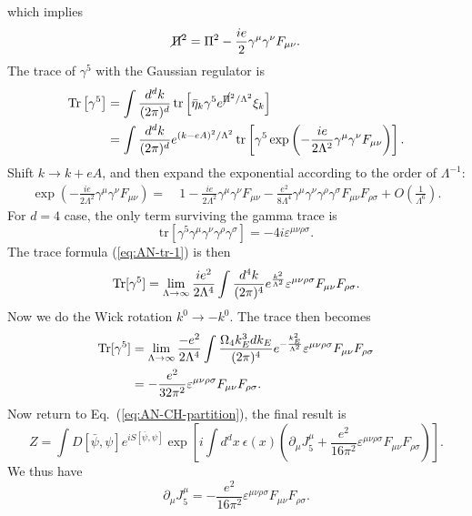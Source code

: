 which implies
\begin{equation}
	\cancel{\Pi}^2 = \Pi^2 - \frac{ie}{2}\gamma^\mu \gamma^\nu F_{\mu\nu}.
\end{equation}
The trace of $\gamma^5$ with the Gaussian regulator is
\begin{equation}
\begin{aligned}
	\operatorname{Tr}\left[\gamma^5\right] 
	&= \int \frac{d^d k}{(2\pi)^d} \operatorname{tr}\left[\bar\eta_k \gamma^5 e^{\cancel{\Pi}^2/\Lambda^2}\xi_k \right] \\
	&= \int \frac{d^d k}{(2\pi)^d} e^{(k-eA)^2/\Lambda^2}\operatorname{tr}\left[\gamma^5 \exp\left(-\frac{ie}{2\Lambda^2} \gamma^\mu \gamma^\nu F_{\mu\nu}\right)\right].
\end{aligned}
\end{equation}
Shift $k \rightarrow k + e A$, and then expand the exponential according to the order of $\Lambda^{-1}$:
\begin{equation}
\begin{aligned}
	\exp\left(-\frac{ie}{2\Lambda^2} \gamma^\mu \gamma^\nu F_{\mu\nu}\right)
	=&\ 1-\frac{ie}{2\Lambda^2} \gamma^\mu \gamma^\nu F_{\mu\nu}-\frac{e^2}{8\Lambda^4} \gamma^\mu \gamma^\nu \gamma^\rho \gamma^\sigma F_{\mu\nu} F_{\rho\sigma} + O\left(\frac{1}{\Lambda^6}\right).
\end{aligned}
\end{equation}
For $d=4$ case, the only term surviving the gamma trace is
\begin{equation}
	\mathrm{tr} \left[\gamma^5 \gamma^\mu \gamma^\nu \gamma^\rho \gamma^\sigma \right] 
	= -4i\varepsilon^{\mu\nu\rho\sigma}.
\end{equation}
The trace formula (\ref{eq:AN-tr-1}) is then
\begin{equation}
	\operatorname{Tr}[\gamma^5] = \lim_{\Lambda\rightarrow\infty} \frac{ie^2}{2\Lambda^4} \int \frac{d^4k}{(2\pi)^4} e^{\frac{k^2}{\Lambda^2}}  \varepsilon^{\mu\nu\rho\sigma}F_{\mu\nu} F_{\rho\sigma}.
\end{equation}
Now we do the Wick rotation $k^0 \rightarrow -k^0$. 
The trace then becomes
\begin{equation}
\begin{aligned}
	\operatorname{Tr}[\gamma^5] &= \lim_{\Lambda\rightarrow\infty} \frac{-e^2}{2\Lambda^4} \int \frac{\Omega_4 k^3_E dk_E}{(2\pi)^4} e^{-\frac{k_E^2}{\Lambda^2}}  \varepsilon^{\mu\nu\rho\sigma}F_{\mu\nu} F_{\rho\sigma} \\
	&= -\frac{e^2}{32\pi^2} \varepsilon^{\mu\nu\rho\sigma}F_{\mu\nu} F_{\rho\sigma}.
\end{aligned}
\end{equation}
Now return to Eq.~(\ref{eq:AN-CH-partition}), the final result is
\begin{equation}
	Z = \int D[\bar\psi,\psi] e^{iS[\bar\psi,\psi]} \exp\left[i\int d^d x \ \epsilon(x) \left(\partial_\mu J_5^\mu+ \frac{e^2}{16\pi^2}\varepsilon^{\mu\nu\rho\sigma}F_{\mu\nu} F_{\rho\sigma}\right)\right].
\end{equation}
We thus have
\begin{equation}
	\partial_\mu J^\mu_5 = -\frac{e^2}{16\pi^2}\varepsilon^{\mu\nu\rho\sigma}F_{\mu\nu} F_{\rho\sigma}.
\end{equation}

